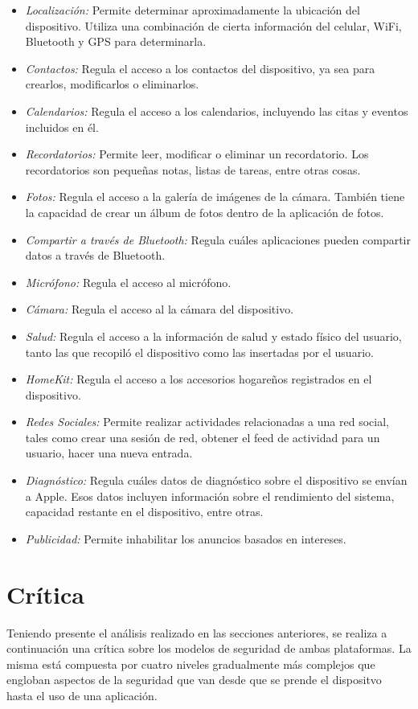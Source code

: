 \begin{itemize}
	\item \emph{Localización:} Permite determinar aproximadamente la ubicación del dispositivo. Utiliza una combinación de cierta información del celular, WiFi, Bluetooth y GPS para determinarla.
	\item \emph{Contactos:} Regula el acceso a los contactos del dispositivo, ya sea para crearlos, modificarlos o eliminarlos.
	\item \emph{Calendarios:} Regula el acceso a los calendarios, incluyendo las citas y eventos incluidos en él.
	\item \emph{Recordatorios:} Permite leer, modificar o eliminar un recordatorio. Los recordatorios son pequeñas notas, listas de tareas, entre otras cosas.
	\item \emph{Fotos:} Regula el acceso a la galería de imágenes de la cámara. También tiene la capacidad de crear un álbum de fotos dentro de la aplicación de fotos.
	\item \emph{Compartir a través de Bluetooth:} Regula cuáles aplicaciones pueden compartir datos a través de Bluetooth.
	\item \emph{Micrófono:} Regula el acceso al micrófono.
	\item \emph{Cámara:} Regula el acceso al la cámara del dispositivo.
	\item \emph{Salud:} Regula el acceso a la información de salud y estado físico del usuario, tanto las que recopiló el dispositivo como las insertadas por el usuario.
	\item \emph{HomeKit:} Regula el acceso a los accesorios hogareños registrados en el dispositivo.			
	\item \emph{Redes Sociales:} Permite realizar actividades relacionadas a una red social, tales como crear una sesión de red, obtener el feed de actividad para un usuario, hacer una nueva entrada.
	\item \emph{Diagnóstico:} Regula cuáles datos de diagnóstico sobre el dispositivo se envían a Apple. Esos datos incluyen información sobre el rendimiento del sistema, capacidad restante en el dispositivo, entre otras.
	\item \emph{Publicidad:} Permite inhabilitar los anuncios basados en intereses.
\end{itemize}
\section{Crítica}
Teniendo presente el análisis realizado en las secciones anteriores, se realiza a continuación una crítica sobre los modelos de seguridad de ambas plataformas. La misma está compuesta por cuatro niveles gradualmente más complejos que engloban aspectos de la seguridad que van desde que se prende el dispositvo hasta el uso de una aplicación.
